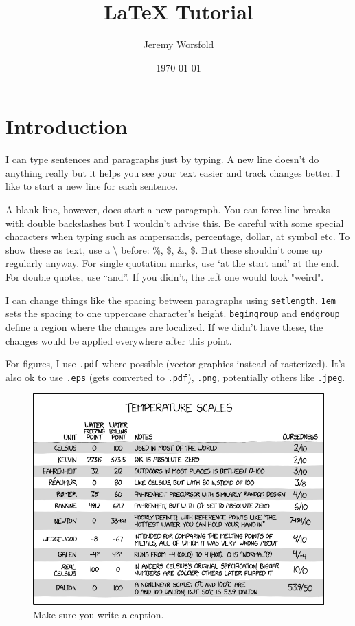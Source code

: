 \documentclass{article}
\title{LaTeX Tutorial}
\author{Jeremy Worsfold}
\date{\today}
\begin{document}
\maketitle

\section{Introduction}

I can type sentences and paragraphs just by typing.
A new line doesn't do anything really but it helps you see your text easier and track changes better.
I like to start a new line for each sentence.

A blank line, however, does start a new paragraph. You can force line breaks with double backslashes but I wouldn't advise this. 
Be careful with some special characters when typing such as ampersands, percentage, dollar, at symbol etc. 
To show these as text, use a \textbackslash\; before: \%, \$, \&, \$. 
But these shouldn't come up regularly anyway.
For single quotation marks, use `at the start and' at the end. For double quotes, use ``and''. 
If you didn't, the left one would look "weird".

\begingroup
\setlength{\parskip}{1em}
I can change things like the spacing between paragraphs using \texttt{setlength}.
\texttt{1em} sets the spacing to one uppercase character's height. 
\texttt{begingroup} and \texttt{endgroup} define a region where the changes are localized. If we didn't have these, the changes would be applied everywhere after this point.

For figures, I use \texttt{.pdf} where possible (vector graphics instead of rasterized). It's also ok to use \texttt{.eps} (gets converted to \texttt{.pdf}), \texttt{.png}, potentially others like  \texttt{.jpeg}.
\begin{figure}
    \centering
    \includegraphics[width=0.8\linewidth]{temperature_scales.png}
    \caption{Make sure you write a caption.}
    \label{fig:temp-scales}
\end{figure}
\end{document}
